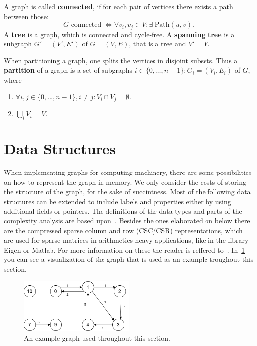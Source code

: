         A graph is called \textbf{connected}, if for each pair of vertices there exists a path between those: 
        \[G \text{ connected } \Leftrightarrow \forall v_i, v_j \in V: \exists \text{ Path}(u, v).\]
        A \textbf{tree} is a graph, which is connected and cycle-free. 
        A \textbf{spanning tree} is a subgraph $G' = (V', E')$ of $G = (V, E)$, that is a tree and $V' = V$. 
        
        When partitioning a graph, one splits the vertices in disjoint subsets. 
        Thus a \textbf{partition} of a graph is a set of subgraphs $i\in \{0, \dots, n-1\}: G_i = (V_i, E_i)$ of $G$, where 
        \begin{enumerate}
            \item $\forall i,j \in \{0, \dots, n-1\}, i \neq j: V_i \cap V_j = \emptyset$.
            \item $\bigcup_i V_i = V$.
        \end{enumerate}
            
    \section{Data Structures}\label{\positionnumber}
        When implementing graphs for computing machinery, there are some possibilities on how to represent the graph in memory.
        We only consider the costs of storing the structure of the graph, for the sake of succintness. 
        Most of the following data structures can be extended to include labels and properties either by using additional fields or pointers. 
        The definitions of the data types and parts of the complexity analysis are based upon~\autocite{Gross1998GraphTA, aho1974design, cormen2009introduction, Goodrich2014AlgorithmDA, steinhaus2010g}. 
        Besides the ones elaborated on below there are the compressed sparse column and row (CSC/CSR) representations, which are used for sparse matrices in arithmetics-heavy applications, like in the library Eigen or Matlab. 
        For more information on these the reader is reffered to~\autocite{steinhaus2010g, Eisenstat1982YaleSM}. In~\ref{data_struct-ex} you can see a visualization of the graph that is used as an example troughout this section.
        
        \begin{figure}[htp]
            \begin{center}
                \includegraphics[keepaspectratio,width=0.5\textwidth]{img/03-preliminaries/data_struct_gr.png}
            \end{center}
            \caption{An example graph used throughout this section.} 
            \label{data_struct-ex}
        \end{figure}
        
